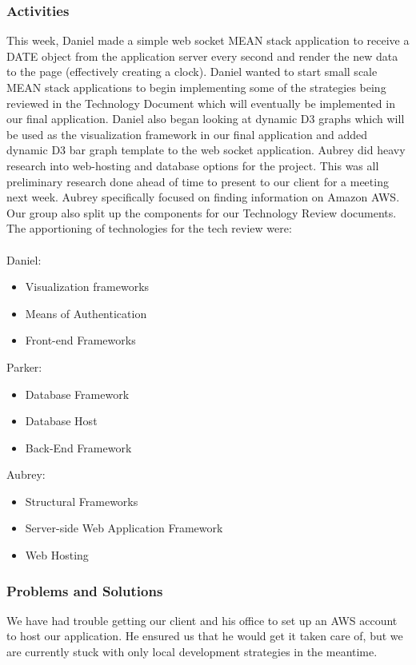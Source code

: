 \documentclass[journal,10pt,onecolumn,compsoc]{IEEEtran} \usepackage[margin=1.0in]{geometry} \usepackage{pdfpages}
\begin{document}
    \subsubsection{Activities}
    This week, Daniel made a simple web socket MEAN stack application to receive a DATE object from the application server every second and render the new data to the page (effectively creating a clock). Daniel wanted to start small scale MEAN stack applications to begin implementing some of the strategies being reviewed in the Technology Document which will eventually be implemented in our final application. Daniel also began looking at dynamic D3 graphs which will be used as the visualization framework in our final application and added dynamic D3 bar graph template to the web socket application.
    \noindent Aubrey did heavy research into web-hosting and database options for the project. This was all preliminary research done ahead of time to present to our client for a meeting next week. Aubrey specifically focused on finding information on Amazon AWS.
	\noindent Our group also split up the components for our Technology Review documents. The apportioning of technologies for the tech review were: \\\\ %
    \noindent Daniel:
    \begin{itemize}
    \item Visualization frameworks
    \item Means of Authentication
    \item Front-end Frameworks
    \end{itemize}
    
    \noindent Parker:
    \begin{itemize}
    \item Database Framework
    \item Database Host
    \item Back-End Framework
    \end{itemize}
    
    \noindent Aubrey:
    \begin{itemize}
    \item Structural Frameworks
    \item Server-side Web Application Framework
    \item Web Hosting
    \end{itemize}
    
    \subsubsection{Problems and Solutions} 
    We have had trouble getting our client and his office to set up an AWS account to host our application. He ensured us that he would get it taken care of, but we are currently stuck with only local development strategies in the meantime.
\end{document}
